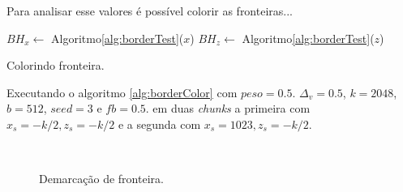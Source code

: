 Para analisar esse valores é possível colorir as fronteiras...

\begin{algorithm}[H]\label{alg:borderColor}%
    $BH_{x} \leftarrow$ Algoritmo\ref{alg:borderTest}($x$)\;
    $BH_{z} \leftarrow$ Algoritmo\ref{alg:borderTest}($z$)\;
    
    
    \caption{Colorindo fronteira.}
\end{algorithm}

Executando o algoritmo \ref{alg:borderColor} com $peso = 0.5$. $\Delta_{v} = 0.5$, 
$k = 2048$, $b = 512$, $seed = 3$ e $fb = 0.5$. em duas \textit{chunks} a primeira com $ x_{s} = -k/2 , z_{s} = -k/2$
e a segunda com $ x_{s} = 1023 , z_{s} = -k/2$.

\begin{figure}[H]
     \centering
     \hspace{0.1cm}
     \\
     \caption{Demarcação de fronteira.}
     
     \label{fig:borderlenanotherauxyeah}
\end{figure}

